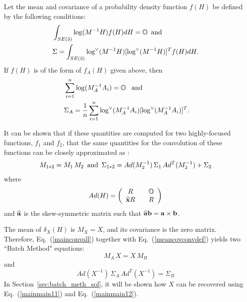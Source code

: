 \documentclass[twocolumn,10pt]{asme2ej}
\begin{document}
Let the mean and covariance of a probability density function $f(H)$ be defined by the following conditions:
\begin{equation} \begin{split} &\int_{SE(3)} \log(M^{-1} H) f(H) dH = \mathbb{O} \,\,\, {\rm and} \,\,\,\\ &\Sigma = \int_{SE(3)} \log^{\vee}(M^{-1} H) [\log^{\vee}(M^{-1} H)]^T  f(H) dH . \end{split}\label{meancovdef} \end{equation}
If $f(H)$ is of the form of $f_A(H)$ given above, then
\begin{equation} \
\begin{split} &\sum_{i=1}^{n} \log(M_A^{-1} A_i) = \mathbb{O} {\rm \,\,\,\,\, and} \\
&\Sigma_A = \frac{1}{n} \sum_{i=1}^{n} \log^{\vee}(M_A^{-1} A_i) [\log^{\vee}(M_A^{-1} A_i)]^T.  \label{datameancovconvdef} \end{split}
\end{equation}

It can be shown that if these quantities are computed for two highly-focused functions, $f_1$ and $f_2$, that the same quantities for
the convolution of these functions can be closely approximated as \cite{Wang08}:
\begin{equation}
M_{1*2} = M_1 \, M_2 \,\,\, {\rm and} \,\,\, \Sigma_{1*2} = Ad(M_2^{-1}) \,\Sigma_{1}\, Ad^T(M_2^{-1}) + \Sigma_{2}
\label{meancovconvdef} \end{equation}
where
\begin{equation} 
Ad(H) = \left(\begin{array}{ccc}
R && \mathbb{O} \\
\widehat{{\bf x}} R && R \end{array}\right) 
\label{adjdef} \end{equation}
and $\widehat{{\bf a}}$ is the skew-symmetric matrix such that $\widehat{{\bf a}} {\bf b} = {\bf a} \times {\bf b}$.

The mean of $\delta_X(H)$ is $M_X = X$, and its covariance is the zero matrix.
Therefore, Eq.~(\ref{mainconvall}) together with Eq.~(\ref{meancovconvdef}) yields two ``Batch Method" equations:
\begin{equation}
\boxed{\,
M_A \, X = X \, M_B
\,}
\label{mainmain11} \end{equation}
and
\begin{equation}
\boxed{\,
Ad(X^{-1}) \, \Sigma_{A} \, Ad^T(X^{-1}) = \Sigma_{B}
\,}
\label{mainmain12} \end{equation}
In Section~\ref{sec:batch_meth_sol}, it will be shown how $X$ can be recovered using Eq.~(\ref{mainmain11}) and Eq.~(\ref{mainmain12}).
\end{document}
